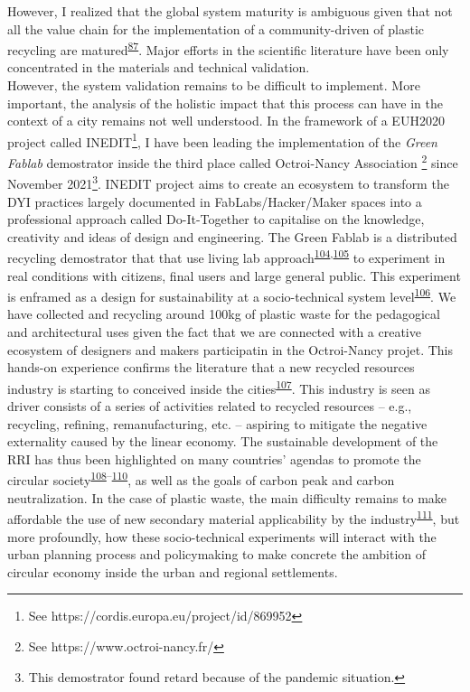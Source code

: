 \documentclass[
  12pt,
  a4paperpaper,
  onecolumn]{article}
\begin{document}
However, I realized that the global system maturity is ambiguous given
that not all the value chain for the implementation of a
community-driven of plastic recycling are
matured\textsuperscript{\protect\hyperlink{ref-CruzSanchez2020}{87}}.
Major efforts in the scientific literature have been only concentrated
in the materials and technical validation.\\
However, the system validation remains to be difficult to implement.
More important, the analysis of the holistic impact that this process
can have in the context of a city remains not well understood. In the
framework of a EUH2020 project called INEDIT\footnote{See
  https://cordis.europa.eu/project/id/869952}, I have been leading the
implementation of the \emph{Green Fablab} demostrator inside the third
place called Octroi-Nancy Association \footnote{See
  https://www.octroi-nancy.fr/} since November 2021\footnote{This
  demostrator found retard because of the pandemic situation.}. INEDIT
project aims to create an ecosystem to transform the DYI practices
largely documented in FabLabs/Hacker/Maker spaces into a professional
approach called Do-It-Together to capitalise on the knowledge,
creativity and ideas of design and engineering. The Green Fablab is a
distributed recycling demostrator that that use living lab
approach\textsuperscript{\protect\hyperlink{ref-tyl2021}{104},\protect\hyperlink{ref-compagnucci2020a}{105}}
to experiment in real conditions with citizens, final users and large
general public. This experiment is enframed as a design for
sustainability at a socio-technical system
level\textsuperscript{\protect\hyperlink{ref-Ceschin2016}{106}}. We have
collected and recycling around 100kg of plastic waste for the
pedagogical and architectural uses given the fact that we are connected
with a creative ecosystem of designers and makers participatin in the
Octroi-Nancy projet. This hands-on experience confirms the literature
that a new recycled resources industry is starting to conceived inside
the cities\textsuperscript{\protect\hyperlink{ref-wang2019b}{107}}. This
industry is seen as driver consists of a series of activities related to
recycled resources -- e.g., recycling, refining, remanufacturing, etc.
-- aspiring to mitigate the negative externality caused by the linear
economy. The sustainable development of the RRI has thus been
highlighted on many countries' agendas to promote the circular
society\textsuperscript{\protect\hyperlink{ref-leipold2021}{108}--\protect\hyperlink{ref-jaeger-erben2021a}{110}},
as well as the goals of carbon peak and carbon neutralization. In the
case of plastic waste, the main difficulty remains to make affordable
the use of new secondary material applicability by the
industry\textsuperscript{\protect\hyperlink{ref-klotz2022}{111}}, but
more profoundly, how these socio-technical experiments will interact
with the urban planning process and policymaking to make concrete the
ambition of circular economy inside the urban and regional settlements.
\end{document}
